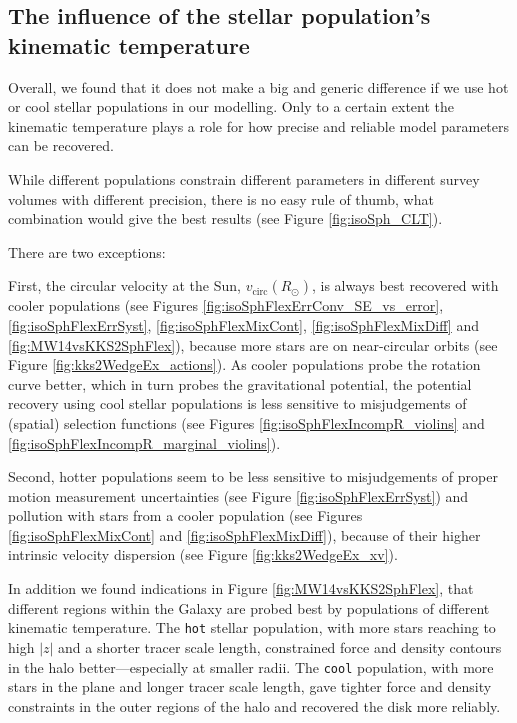 \subsection{The influence of the stellar population's kinematic temperature} \label{sec:results_temperature}

Overall, we found that it does not make a big and generic difference if we use hot or cool stellar populations in our modelling. Only to a certain extent the kinematic temperature plays a role for how precise and reliable model parameters can be recovered. 

While different populations constrain different parameters in different survey volumes with different precision, there is no easy rule of thumb, what combination would give the best results (see Figure \ref{fig:isoSph_CLT}).

There are two exceptions: 

First, the circular velocity at the Sun, $v_\text{circ}(R_\odot)$, is always best recovered with cooler populations (see Figures \ref{fig:isoSphFlexErrConv_SE_vs_error}, \ref{fig:isoSphFlexErrSyst}, \ref{fig:isoSphFlexMixCont}, \ref{fig:isoSphFlexMixDiff} and \ref{fig:MW14vsKKS2SphFlex}), because more stars are on near-circular orbits (see Figure \ref{fig:kks2WedgeEx_actions}). As cooler populations probe the rotation curve better, which in turn probes the gravitational potential, the potential recovery using cool stellar populations is less sensitive to misjudgements of (spatial) selection functions (see Figures \ref{fig:isoSphFlexIncompR_violins} and \ref{fig:isoSphFlexIncompR_marginal_violins}).

Second, hotter populations seem to be less sensitive to misjudgements of proper motion measurement uncertainties (see Figure \ref{fig:isoSphFlexErrSyst}) and pollution with stars from a cooler population (see Figures \ref{fig:isoSphFlexMixCont} and \ref{fig:isoSphFlexMixDiff}), because of their higher intrinsic velocity dispersion (see Figure \ref{fig:kks2WedgeEx_xv}).

In addition we found indications in Figure \ref{fig:MW14vsKKS2SphFlex}, that different regions within the Galaxy are probed best by populations of different kinematic temperature. The \texttt{hot} stellar population, with more stars reaching to high $|z|$ and a shorter tracer scale length, constrained force and density contours in the halo better---especially at smaller radii. The \texttt{cool} population, with more stars in the plane and longer tracer scale length, gave tighter force and density constraints in the outer regions of the halo and recovered the disk more reliably.